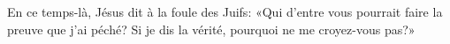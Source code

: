 En ce temps-là, Jésus dit à la foule des Juifs:
	«Qui d’entre vous pourrait faire la preuve que j’ai péché?
	Si je dis la vérité, pourquoi ne me croyez-vous pas?»
